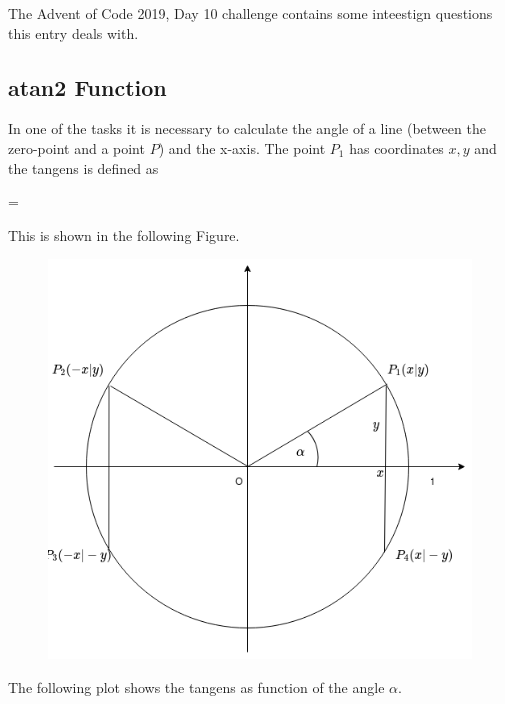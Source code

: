 
The Advent of Code 2019, Day 10 challenge contains some inteestign questions this entry deals with.

\subsection{atan2 Function}

In one of the tasks it is necessary to calculate the angle of a line (between the zero-point and a point $P$) and the x-axis. The point $P_1$ has coordinates $x, y$ and the tangens is defined as

\bee
\tan \alpha = 
\eee

This is shown in the following Figure.

\begin{figure}[H]
\centering
\includegraphics[scale=0.45]{images/AoC_2019_10_02.png}
\end{figure}

The following plot shows the tangens as function of the angle $\alpha$.

